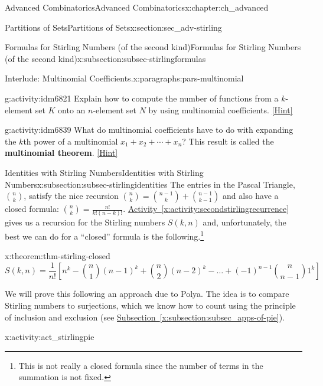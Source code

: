 \documentclass[oneside,10pt,]{book}
\newcommand{\terminology}[1]{\textbf{#1}}
\numberwithin{equation}{chapter}
\begin{document}
\begin{chapterptx}{Advanced Combinatorics}{}{Advanced Combinatorics}{}{}{x:chapter:ch_advanced}
\begin{sectionptx}{Partitions of Sets}{}{Partitions of Sets}{}{}{x:section:sec_adv-stirling}
\begin{subsectionptx}{Formulas for Stirling Numbers (of the second kind)}{}{Formulas for Stirling Numbers (of the second kind)}{}{}{x:subsection:subsec-stirlingformulas}
\begin{paragraphs}{Interlude: Multinomial Coefficients.}{x:paragraphs:pars-multinomial}
\begin{activity}{}{g:activity:idm6821}
Explain how to compute the number of functions from a \(k\)-element set \(K\) onto an \(n\)-element set \(N\) by using multinomial coefficients.%
\space\hspace*{0pt}\hfill{\tiny\hyperlink{g:hint:idm6828-back}{[Hint]}}\end{activity}
\begin{activity}{}{g:activity:idm6839}%
What do multinomial coefficients have to do with expanding the \(k\)th power of a multinomial \(x_1+x_2+\cdots+x_n\)? This result is called the \terminology{multinomial theorem}.%
\space\hspace*{0pt}\hfill{\tiny\hyperlink{g:hint:idm6845-back}{[Hint]}}\end{activity}
\end{paragraphs}%
\end{subsectionptx}
%
%
\typeout{************************************************}
\typeout{************************************************}
%
\begin{subsectionptx}{Identities with Stirling Numbers}{}{Identities with Stirling Numbers}{}{}{x:subsection:subsec-stirlingidentities}
The entries in the Pascal Triangle, \(\binom{n}{k}\), satisfy the nice recursion \(\binom{n}{k} = \binom{n - 1}{k} + \binom{n - 1}{k - 1}\) and also have a closed formula: \(\binom{n}{k} = \frac{n!}{k!(n - k)!}\). \hyperref[x:activity:secondstirlingrecurrence]{Activity~\ref{x:activity:secondstirlingrecurrence}} gives us a recursion for the Stirling numbers \(S(k,n)\) and, unfortunately, the best we can do for a ``closed'' formula is the following.\footnote{This is not really a closed formula since the number of terms in the summation is not fixed.\label{g:fn:idm6887}}%
\begin{theorem}{}{}{x:theorem:thm-stirling-closed}%
%
\begin{equation*}
S(k,n) = \frac{1}{n!}\left[n^{k} - \binom{n}{1} \left( n - 1 \right)^{k} + \binom{n}{2} \left( n - 2 \right)^{k} - \ldots + \left( - 1 \right)^{n - 1}\binom{n}{n - 1} 1^{k} \right] 
\end{equation*}
%
\end{theorem}
We will prove this following an approach due to Polya.  The idea is to compare Stirling numbers to surjections, which we know how to count using the principle of inclusion and exclusion (see \hyperref[x:subsection:subsec_apps-of-pie]{Subsection~\ref{x:subsection:subsec_apps-of-pie}}).%
\begin{activity}{}{x:activity:act_stirlingpie}%

\end{activity}
\end{subsectionptx}
\end{sectionptx}
\end{chapterptx}
\end{document}
